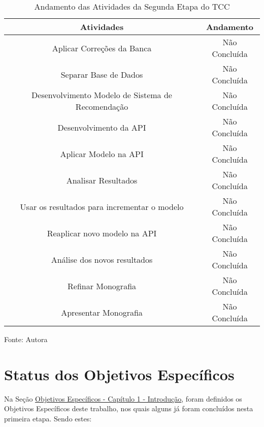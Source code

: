 \begin{table}[htbp]
    \centering
    \begin{threeparttable}
        \caption{Andamento das Atividades da Segunda Etapa do TCC}
        \label{tab:6}
        \begin{tabular}{| c | c |}
        \hline 
        Atividades & Andamento \\
        \hline 
        Aplicar Correções da Banca & Não Concluída \\
        \hline 
        Separar Base de Dados & Não Concluída \\
        \hline 
        Desenvolvimento Modelo de Sistema de Recomendação & Não Concluída \\
        \hline 
        Desenvolvimento da API & Não Concluída \\
        \hline 
        Aplicar Modelo na API & Não Concluída \\
        \hline 
        Analisar Resultados & Não Concluída \\
        \hline 
        Usar os resultados para incrementar o modelo & Não Concluída \\
        \hline 
        Reaplicar novo modelo na API &  Não Concluída \\
        \hline 
        Análise dos novos resultados &  Não Concluída \\
        \hline 
        Refinar Monografia &  Não Concluída \\
        \hline
        Apresentar Monografia &  Não Concluída \\
        \hline 
        \end{tabular}
        \begin{tablenotes}
            \small
            \centering
            \item Fonte: Autora
        \end{tablenotes}
    \end{threeparttable}
\end{table}

\section{Status dos Objetivos Específicos}\label{sec:estobjesp}
Na Seção \hyperref[subsec:objesp]{Objetivos Específicos - Capítulo 1 - Introdução}, foram definidos os Objetivos
Específicos deste trabalho, nos quais alguns já foram concluídos nesta primeira etapa. Sendo estes:

